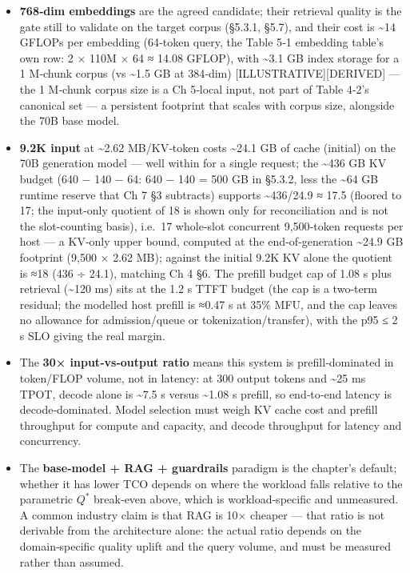 \begin{itemize}
\tightlist
\item
  \textbf{768‑dim embeddings} are the agreed candidate; their retrieval
  quality is the gate still to validate on the target corpus (§5.3.1,
  §5.7), and their cost is \textasciitilde14 GFLOPs per embedding
  (64‑token query, the Table 5‑1 embedding table's own row: 2 × 110M ×
  64 ≈ 14.08 GFLOP), with \textasciitilde3.1 GB index storage for a 1
  M‑chunk corpus (vs \textasciitilde1.5 GB at 384‑dim)
  \mbox{{[}ILLUSTRATIVE{]}}\hspace{0pt}\mbox{{[}DERIVED{]}} --- the 1 M‑chunk corpus size is a Ch
  5‑local input, not part of Table 4‑2's canonical set --- a persistent
  footprint that scales with corpus size, alongside the 70B base model.
\item
  \textbf{9.2K input} at \textasciitilde2.62 MB/KV‑token costs
  \textasciitilde24.1 GB of cache (initial) on the 70B generation model
  --- well within for a single request; the \textasciitilde436 GB KV
  budget (640 − 140 − 64: 640 − 140 = 500 GB in §5.3.2, less the
  \textasciitilde64 GB runtime reserve that Ch 7 §3 subtracts) supports
  \textasciitilde436/24.9 ≈ 17.5 (floored to 17; the input-only quotient
  of 18 is shown only for reconciliation and is not the slot-counting
  basis), i.e.~17 whole‑slot concurrent 9,500‑token requests per host
  --- a KV‑only upper bound, computed at the end‑of‑generation
  \textasciitilde24.9 GB footprint (9,500 × 2.62 MB); against the
  initial 9.2K KV alone the quotient is ≈18 (436 ÷ 24.1), matching Ch 4
  §6. The prefill budget cap of 1.08 s plus retrieval
  (\textasciitilde120 ms) sits at the 1.2 s TTFT budget (the cap is a
  two-term residual; the modelled host prefill is ≈0.47 s at 35\% MFU,
  and the cap leaves no allowance for admission/queue or
  tokenization/transfer), with the p95 ≤ 2 s SLO giving the real margin.
\item
  The \textbf{30× input‑vs‑output ratio} means this system is
  prefill‑dominated in token/FLOP volume, not in latency: at 300 output
  tokens and \textasciitilde25 ms TPOT, decode alone is
  \textasciitilde7.5 s versus \textasciitilde1.08 s prefill, so
  end‑to‑end latency is decode‑dominated. Model selection must weigh KV
  cache cost and prefill throughput for compute and capacity, and decode
  throughput for latency and concurrency.
\item
  The \textbf{base‑model + RAG + guardrails} paradigm is the chapter's
  default; whether it has lower TCO depends on where the workload falls
  relative to the parametric \(Q^*\) break‑even above, which is
  workload‑specific and unmeasured. A common industry claim is that RAG
  is 10× cheaper --- that ratio is not derivable from the architecture
  alone: the actual ratio depends on the domain‑specific quality uplift
  and the query volume, and must be measured rather than assumed.
\end{itemize}

